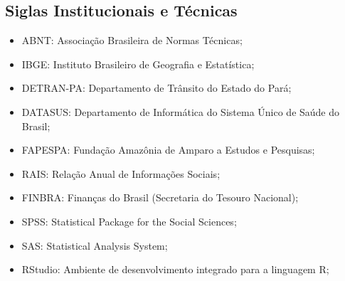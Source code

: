 \begin{refsection}

\section*{Siglas Institucionais e Técnicas}

\begin{itemize}
\item ABNT: Associação Brasileira de Normas Técnicas;
\item IBGE: Instituto Brasileiro de Geografia e Estatística;
\item DETRAN-PA: Departamento de Trânsito do Estado do Pará;
\item DATASUS: Departamento de Informática do Sistema Único de Saúde do Brasil;
\item FAPESPA: Fundação Amazônia de Amparo a Estudos e Pesquisas;
\item RAIS: Relação Anual de Informações Sociais;
\item FINBRA: Finanças do Brasil (Secretaria do Tesouro Nacional);
\item SPSS: Statistical Package for the Social Sciences;
\item SAS: Statistical Analysis System;
\item RStudio: Ambiente de desenvolvimento integrado para a linguagem R;
\end{itemize}

\printbibliography[heading=subbibliography]
\end{refsection}
